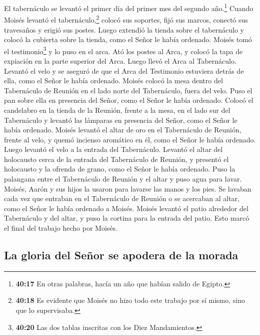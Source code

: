  El tabernáculo se levantó el primer día del primer mes
del segundo año.\footnote{\textbf{40:17} En otras palabras, hacía un año
  que habían salido de Egipto.}  Cuando Moisés levantó el
tabernáculo,\footnote{\textbf{40:18} Es evidente que Moisés no hizo todo
  este trabajo por sí mismo, sino que lo supervisaba.} colocó sus
soportes, fijó sus marcos, conectó sus travesaños y erigió sus postes.
 Luego extendió la tienda sobre el tabernáculo y colocó
la cubierta sobre la tienda, como el Señor le había ordenado.
 Moisés tomó el testimonio\footnote{\textbf{40:20} Las
  dos tablas inscritas con los Diez Mandamientos.} y lo puso en el arca.
Ató los postes al Arca, y colocó la tapa de expiación en la parte
superior del Arca.  Luego llevó el Arca al Tabernáculo.
Levantó el velo y se aseguró de que el Arca del Testimonio estuviera
detrás de ella, como el Señor le había ordenado.  Moisés
colocó la mesa dentro del Tabernáculo de Reunión en el lado norte del
Tabernáculo, fuera del velo.  Puso el pan sobre ella en
presencia del Señor, como el Señor le había ordenado. 
Colocó el candelabro en la tienda de la Reunión, frente a la mesa, en el
lado sur del Tabernáculo  y levantó las lámparas en
presencia del Señor, como el Señor le había ordenado. 
Moisés levantó el altar de oro en el Tabernáculo de Reunión, frente al
velo,  y quemó incienso aromático en él, como el Señor le
había ordenado.  Luego levantó el velo a la entrada del
Tabernáculo.  Levantó el altar del holocausto cerca de la
entrada del Tabernáculo de Reunión, y presentó el holocausto y la
ofrenda de grano, como el Señor le había ordenado.  Puso
la palangana entre el Tabernáculo de Reunión y el altar y puso agua para
lavar.  Moisés, Aarón y sus hijos la usaron para lavarse
las manos y los pies.  Se lavaban cada vez que entraban
en el Tabernáculo de Reunión o se acercaban al altar, como el Señor le
había ordenado a Moisés.  Moisés levantó el patio
alrededor del Tabernáculo y del altar, y puso la cortina para la entrada
del patio. Esto marcó el final del trabajo hecho por Moisés.

\hypertarget{la-gloria-del-seuxf1or-se-apodera-de-la-morada}{%
\subsection{La gloria del Señor se apodera de la
morada}\label{la-gloria-del-seuxf1or-se-apodera-de-la-morada}}

